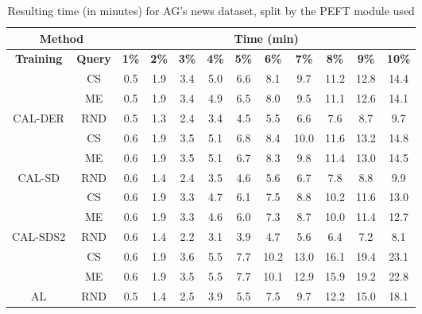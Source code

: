 \begin{table}[htbp]
\begin{subtable}{\linewidth}
\begin{tabular}{c|c|cccccccccc}
\toprule
\multicolumn{2}{c|}{\textbf{Method}} & \multicolumn{10}{c}{\textbf{Time (min)}} \\
\midrule
\textbf{Training} & \textbf{Query} & \textbf{1\%} & \textbf{2\%} & \textbf{3\%} & \textbf{4\%} & \textbf{5\%} & \textbf{6\%} & \textbf{7\%} & \textbf{8\%} & \textbf{9\%} & \textbf{10\%}\\
\midrule
 & CS & 0.5 & 1.9 & 3.4 & 5.0 & 6.6 & 8.1 & 9.7 & 11.2 & 12.8 & 14.4\\

 & ME & 0.5 & 1.9 & 3.4 & 4.9 & 6.5 & 8.0 & 9.5 & 11.1 & 12.6 & 14.1\\

\multirow{-3}{*}{\raggedright\arraybackslash CAL-DER} & RND & 0.5 & 1.3 & 2.4 & 3.4 & 4.5 & 5.5 & 6.6 & 7.6 & 8.7 & 9.7\\
\midrule
 & CS & 0.6 & 1.9 & 3.5 & 5.1 & 6.8 & 8.4 & 10.0 & 11.6 & 13.2 & 14.8\\

 & ME & 0.6 & 1.9 & 3.5 & 5.1 & 6.7 & 8.3 & 9.8 & 11.4 & 13.0 & 14.5\\

\multirow{-3}{*}{\raggedright\arraybackslash CAL-SD} & RND & 0.6 & 1.4 & 2.4 & 3.5 & 4.6 & 5.6 & 6.7 & 7.8 & 8.8 & 9.9\\
\midrule
 & CS & 0.6 & 1.9 & 3.3 & 4.7 & 6.1 & 7.5 & 8.8 & 10.2 & 11.6 & 13.0\\

 & ME & 0.6 & 1.9 & 3.3 & 4.6 & 6.0 & 7.3 & 8.7 & 10.0 & 11.4 & 12.7\\

\multirow{-3}{*}{\raggedright\arraybackslash CAL-SDS2} & RND & 0.6 & 1.4 & 2.2 & 3.1 & 3.9 & 4.7 & 5.6 & 6.4 & 7.2 & 8.1\\
\midrule
 & CS & 0.6 & 1.9 & 3.6 & 5.5 & 7.7 & 10.2 & 13.0 & 16.1 & 19.4 & 23.1\\

 & ME & 0.6 & 1.9 & 3.5 & 5.5 & 7.7 & 10.1 & 12.9 & 15.9 & 19.2 & 22.8\\

\multirow{-3}{*}{\raggedright\arraybackslash AL} & RND & 0.5 & 1.4 & 2.5 & 3.9 & 5.5 & 7.5 & 9.7 & 12.2 & 15.0 & 18.1\\
\bottomrule
\end{tabular}
\end{subtable}
\caption{Resulting time (in minutes) for AG's news dataset, split by the PEFT module used}
\label{tab:time_short_agnews_10}
\end{table}
